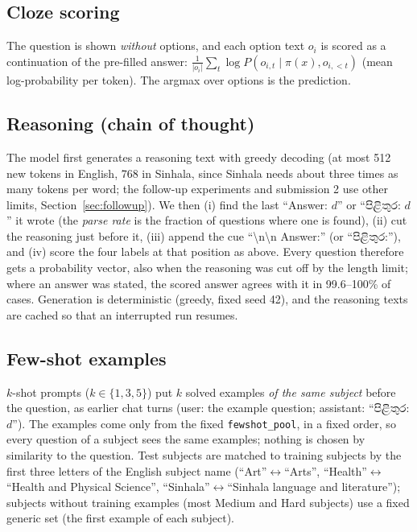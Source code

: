 \documentclass[10pt,a4paper]{article}
\newcommand{\si}[1]{{\sinhalafont #1}}
\begin{document}
\subsection{Cloze scoring}
The question is shown \emph{without} options, and each option text $o_i$ is scored as a continuation of the pre-filled
answer: $\frac{1}{|o_i|}\sum_t \log P(o_{i,t}\mid \pi(x), o_{i,<t})$ (mean log-probability per token). The argmax
over options is the prediction.

\subsection{Reasoning (chain of thought)}\label{sec:cot}
The model first generates a reasoning text with greedy decoding (at most 512 new tokens in English, 768 in Sinhala,
since Sinhala needs about three times as many tokens per word; the follow-up experiments and submission 2 use other
limits, Section~\ref{sec:followup}). We then (i) find the last ``Answer: $d$'' or
``\si{පිළිතුර}: $d$'' it wrote (the \emph{parse rate} is the fraction of questions where one is found), (ii) cut the
reasoning just before it, (iii) append the cue ``\textbackslash n\textbackslash n Answer:\textvisiblespace'' (or
``\si{පිළිතුර}:\textvisiblespace''), and (iv) score the four labels at that position as above. Every question therefore
gets a probability vector, also when the reasoning was cut off by the length limit; where an answer was stated,
the scored answer agrees with it in 99.6--100\% of cases. Generation is deterministic (greedy, fixed seed 42), and the
reasoning texts are cached so that an interrupted run resumes.

\subsection{Few-shot examples}
$k$-shot prompts ($k\in\{1,3,5\}$) put $k$ solved examples \emph{of the same subject} before the question, as earlier
chat turns (user: the example question; assistant: ``\si{පිළිතුර}: $d$''). The examples come only from the fixed
\texttt{fewshot\_pool}, in a fixed order, so every question of a subject sees the same examples; nothing is chosen by
similarity to the question. Test subjects are matched to training subjects by the first three letters of the
English subject name (``Art''$\leftrightarrow$``Arts'', ``Health''$\leftrightarrow$``Health and Physical Science'',
``Sinhala''$\leftrightarrow$``Sinhala language and literature''); subjects without training examples (most Medium and
Hard subjects) use a fixed generic set (the first example of each subject).
\end{document}
